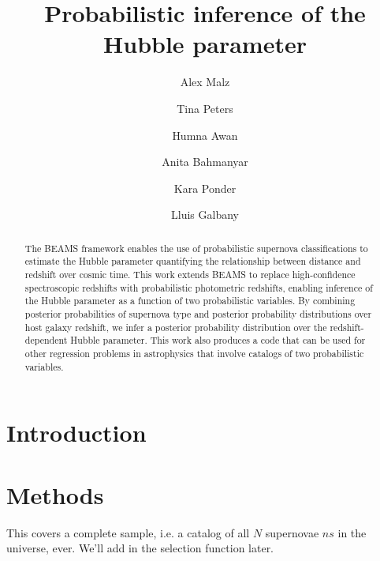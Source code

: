 \documentclass[12pt, onecolumn]{emulateapj}
\begin{document}
\title{Probabilistic inference of the Hubble parameter}

\author{Alex Malz}
\author{Tina Peters}
\author{Humna Awan}
\author{Anita Bahmanyar}
\author{Kara Ponder}
\author{Lluis Galbany}

\begin{abstract}
The BEAMS framework enables the use of probabilistic supernova classifications to estimate the Hubble parameter quantifying the relationship between distance and redshift over cosmic time.  This work extends BEAMS to replace high-confidence spectroscopic redshifts with probabilistic photometric redshifts, enabling inference of the Hubble parameter as a function of two probabilistic variables.  By combining posterior probabilities of supernova type and posterior probability distributions over host galaxy redshift, we infer a posterior probability distribution over the redshift-dependent Hubble parameter.  This work also produces a code that can be used for other regression problems in astrophysics that involve catalogs of two probabilistic variables.
\end{abstract}

\keywords{}

\section{Introduction}
\label{sec:intro}

\citet{kunz_bayesian_2007, kelly_flexible_2008}

\section{Methods}
\label{sec:meth}

This covers a complete sample, i.e. a catalog of all $N$ supernovae $ns$ in the universe, ever.  We'll add in the selection function later.
\end{document}
